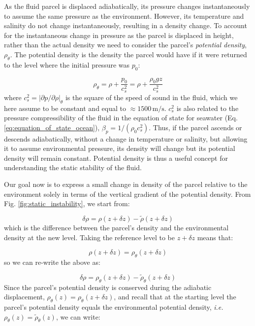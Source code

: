 \documentclass[12pt]{article}
\numberwithin{equation}{section}
\numberwithin{figure}{section}
\numberwithin{table}{section}
\begin{document}
As the fluid parcel is displaced adiabatically, its pressure changes
instantaneously to assume the same pressure as the environment.
However, its temperature and salinity do not change instantaneously, resulting
in a density change.
To account for the instantaneous change in pressure as the parcel is displaced
in height, rather than the actual density we need to consider the parcel's
\textit{potential density}, $\rho_\theta$.
The potential density is the density the parcel would have if it were returned
to the level where the initial pressure was $p_0$:

\begin{equation}
  \rho_\theta = \rho + \frac{p_0}{c_s^2} = \rho + \frac{\rho_0 g z}{c_s^2}
  \label{eq:potential_density}
\end{equation}
where $c_s^2 = \left| \partial p / \partial \rho \right|_\theta$ is the square of
the speed of sound in the fluid, which we here assume to be constant and equal
to $\approx 1500 \, \text{m/s}$.
$c_s^2$ is also related to the pressure compressibility of the fluid in the
equation of state for seawater (Eq. \ref{eq:equation_of_state_ocean}),
$\beta_p = 1/(\rho_0 c_s^2)$.
Thus, if the parcel ascends or descends adiabatically, without a change in
temperature or salinity, but allowing it to assume environmental pressure,
its density will change but its potential density will remain constant.
Potential density is thus a useful concept for understanding the static stability
of the fluid.

Our goal now is to express a small change in density of the parcel relative to
the environment solely in terms of the vertical gradient of the potential density.
From Fig. \ref{fig:static_instability}, we start from:

\begin{equation}
  \delta \rho = \rho(z + \delta z) - \widetilde{\rho}(z + \delta z)
\end{equation}
which is the difference between the parcel's density and the environmental
density at the new level.
Taking the reference level to be  $z + \delta z$ means that:

\begin{equation}
  \rho(z + \delta z) = \rho_\theta(z + \delta z)
\end{equation}
so we can re-write the above as:

\begin{equation}
  \delta \rho = \rho_\theta(z + \delta z) - \widetilde{\rho}_\theta(z + \delta z)
\end{equation}
Since the parcel's potential density is conserved during the adiabatic
displacement, $\rho_\theta(z) = \rho_\theta(z+\delta z)$, and recall that at
the starting level the parcel's potential density equals the environmental
potential density, \textit{i.e.} $\rho_\theta(z) = \widetilde{\rho}_\theta(z)$,
we can write:
\end{document}
